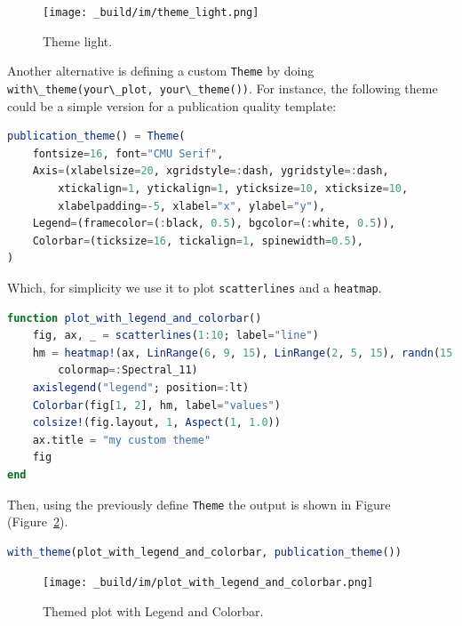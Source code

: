 \documentclass[
  notoc %
]{tufte-book}
\newcommand{\passthrough}[1]{#1}
\begin{document}
\begin{figure}
\hypertarget{fig:theme_light}{%
\centering
\texttt{[image: \_build/im/theme\_light.png]}
\caption{Theme light.}\label{fig:theme_light}
}
\end{figure}

Another alternative is defining a custom \passthrough{\lstinline!Theme!}
by doing
\passthrough{\lstinline!with\_theme(your\_plot, your\_theme())!}. For
instance, the following theme could be a simple version for a
publication quality template:

\begin{lstlisting}[language=Julia]
publication_theme() = Theme(
    fontsize=16, font="CMU Serif",
    Axis=(xlabelsize=20, xgridstyle=:dash, ygridstyle=:dash,
        xtickalign=1, ytickalign=1, yticksize=10, xticksize=10,
        xlabelpadding=-5, xlabel="x", ylabel="y"),
    Legend=(framecolor=(:black, 0.5), bgcolor=(:white, 0.5)),
    Colorbar=(ticksize=16, tickalign=1, spinewidth=0.5),
)
\end{lstlisting}

Which, for simplicity we use it to plot
\passthrough{\lstinline!scatterlines!} and a
\passthrough{\lstinline!heatmap!}.

\begin{lstlisting}[language=Julia]
function plot_with_legend_and_colorbar()
    fig, ax, _ = scatterlines(1:10; label="line")
    hm = heatmap!(ax, LinRange(6, 9, 15), LinRange(2, 5, 15), randn(15, 15);
        colormap=:Spectral_11)
    axislegend("legend"; position=:lt)
    Colorbar(fig[1, 2], hm, label="values")
    colsize!(fig.layout, 1, Aspect(1, 1.0))
    ax.title = "my custom theme"
    fig
end
\end{lstlisting}

Then, using the previously define \passthrough{\lstinline!Theme!} the
output is shown in Figure
(Figure~\ref{fig:plot_with_legend_and_colorbar}).

\begin{lstlisting}[language=Julia]
with_theme(plot_with_legend_and_colorbar, publication_theme())
\end{lstlisting}

\begin{figure}
\hypertarget{fig:plot_with_legend_and_colorbar}{%
\centering
\texttt{[image: \_build/im/plot\_with\_legend\_and\_colorbar.png]}
\caption{Themed plot with Legend and
Colorbar.}\label{fig:plot_with_legend_and_colorbar}
}
\end{figure}
\end{document}
